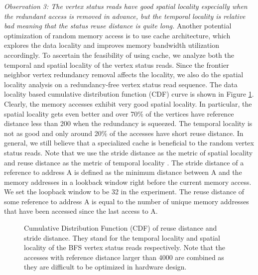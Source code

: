 \textit{Observation 3: The vertex status reads have good 
	spatial locality especially when the redundant access is removed in advance, 
	but the temporal locality is relative bad meaning that the status reuse 
distance is quite long.}
Another potential optimization of random memory access is to use cache architecture, 
which explores the data locality and improves memory bandwidth utilization 
accordingly. To ascertain the feasibility of using cache, we analyze both the 
temporal and spatial locality of the vertex status reads. Since 
the frontier neighbor vertex redundancy removal affects the locality, 
we also do the spatial locality analysis on a redundancy-free 
vertex status read sequence. The data locality based cumulative 
distribution function (CDF) curve is shown in 
Figure \ref{fig:youtube-locality}. Clearly, the memory accesses exhibit 
very good spatial locality. In particular, the spatial 
locality gets even better and over 70\% of the vertices have reference distance 
less than 200 when the redundancy is squeezed. The temporal locality is not as 
good and only around 20\% of the accesses have short reuse distance. In general, 
we still believe that a specialized cache is beneficial to the random 
vertex status reads. Note that we use 
the stride distance as the metric of spatial locality and reuse distance as the metric 
of temporal locality \cite{weinberg2008chameleon}. The stride distance of a reference 
to address A is defined as the minimum distance between A and the 
memory addresses in a lookback window right before the current 
memory access. We set the loopback window to be 32 in the experiment. 
The reuse distance of some reference to 
address A is equal to the number of unique memory addresses that have been 
accessed since the last access to A.  

\begin{figure}
	\caption{Cumulative Distribution Function (CDF) of reuse distance 
		and stride distance. They stand for the temporal locality and spatial 
		locality of the BFS vertex status reads respectively. Note that the 
		accesses with reference distance larger than 4000 are combined as they are difficult 
	to be optimized in hardware design.}
	\label{fig:youtube-locality}
	\vspace{-1.5em}
\end{figure}

